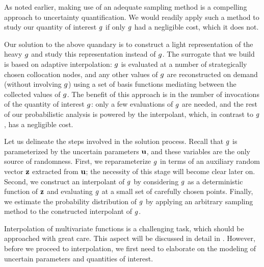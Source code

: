 As noted earlier, making use of an adequate sampling method is a compelling
approach to uncertainty quantification. We would readily apply such a method to
study our quantity of interest $g$ if only $g$ had a negligible cost, which it
does not.

Our solution to the above quandary is to construct a light representation of the
heavy $g$ and study this representation instead of $g$. The surrogate that we
build is based on adaptive interpolation: $g$ is evaluated at a number of
strategically chosen collocation nodes, and any other values of $g$ are
reconstructed on demand (without involving $g$) using a set of basis functions
mediating between the collected values of $g$. The benefit of this approach is
in the number of invocations of the quantity of interest $g$: only a few
evaluations of $g$ are needed, and the rest of our probabilistic analysis is
powered by the interpolant, which, in contrast to $g$, has a negligible cost.

Let us delineate the steps involved in the solution process. Recall that $g$ is
parameterized by the uncertain parameters $\mathbf{u}$, and these variables are the
only source of randomness. First, we reparameterize $g$ in terms of an
auxiliary random vector $\mathbf{z}$ extracted from $\mathbf{u}$; the necessity of this stage
will become clear later on. Second, we construct an interpolant of $g$ by
considering $g$ as a deterministic function of $\mathbf{z}$ and evaluating $g$ at a
small set of carefully chosen points. Finally, we estimate the probability
distribution of $g$ by applying an arbitrary sampling method to the constructed
interpolant of $g$.

Interpolation of multivariate functions is a challenging task, which should be
approached with great care. This aspect will be discussed in detail in
. However, before we proceed to interpolation, we first need
to elaborate on the modeling of uncertain parameters and quantities of interest.

